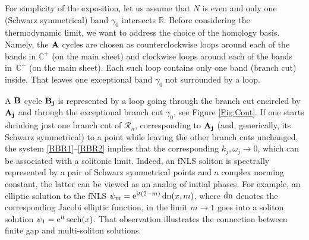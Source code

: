 \documentclass[10pt,a4paper]{amsart}
\numberwithin{equation}{section}
\def\ra{\rightarrow}
\renewcommand{\o}{\omega}
\newcommand{\g}{\gamma}
\def\Rscr{\mathcal{R}}
\newcommand{\sech}{\hbox{sech}}
\def\C{{\mathbb C}}
\def\R{{\mathbb R}}
\def\g{\gamma}
\def\dn{\mathop{\rm dn}\nolimits}
\def\sech{\mathop{\rm sech}\nolimits}
\def\o{\omega}
\def\g{\gamma}
\begin{document}
For simplicity of the exposition, let us assume that $N$ is even and only one (Schwarz symmetrical) band $\g_0$ intersects $\R$.
Before considering the thermodynamic limit, we want to address the choice of the homology basis. Namely, the $\bf A$ cycles are chosen as counterclockwise loops around each of the bands in $\C^+$ (on the main sheet) and clockwise loops around each of the bands in~$\C^-$ (on the main sheet). Each such loop contains only one band (branch cut) inside.
That leaves one exceptional band $\g_0$ not surrounded by a loop.

A $\bf B$ cycle $\bf B_j$ is represented by a loop going through the branch cut encircled by $\bf A_j$ and through
the exceptional branch cut $\g_0$,
see Figure \ref{Fig:Cont}.
If one starts shrinking just one branch cut of $\Rscr_n$, corresponding to $\bf A_j$ (and, generically, its Schwarz symmetrical) to a point while leaving the other branch cuts unchanged, the system \eqref{RBR1}--\eqref{RBR2} implies that the corresponding $k_j,\o_j\ra 0$, which can be associated with a solitonic limit. Indeed, an fNLS soliton is spectrally represented by a pair of Schwarz symmetrical points and a complex norming constant, the latter can be viewed as an analog of initial phases. For example, an elliptic solution to the fNLS $\psi_{m} = {\rm e}^{{\rm i}t(2-m)}\dn(x,m) $, where $\dn$ denotes the corresponding Jacobi elliptic function, in the limit $m\ra 1$ goes into a soliton solution $\psi_{1} = {\rm e}^{{\rm i}t}\sech(x) $. That observation illustrates the connection between finite gap and multi-soliton solutions.
\end{document}
